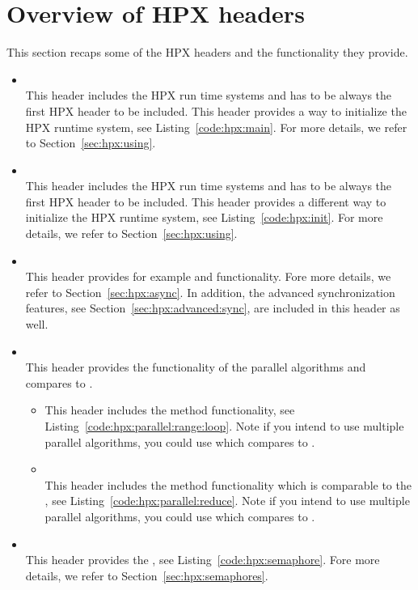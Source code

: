 \section{Overview of HPX headers}
This section recaps some of the HPX headers and the functionality they provide. 
\begin{itemize}
\item {} \\
This header includes the HPX run time systems and has to be always the first HPX header to be included. This header provides a way to initialize the HPX runtime system, see Listing~\ref{code:hpx:main}. For more details, we refer to Section~\ref{sec:hpx:using}. 

\item {} \\
This header includes the HPX run time systems and has to be always the first HPX header to be included. This header provides a different way to initialize the HPX runtime system, see Listing~\ref{code:hpx:init}. For more details, we refer to Section~\ref{sec:hpx:using}.

\item {} \\
This header provides for example  and  functionality. Fore more details, we refer to Section~\ref{sec:hpx:async}. In addition, the advanced synchronization features, see Section~\ref{sec:hpx:advanced:sync}, are included in this header as well.

\item {} \\
This header provides the functionality of the parallel algorithms and compares to .
\begin{itemize}
\item {}
This header includes the method  functionality, see Listing~\ref{code:hpx:parallel:range:loop}. Note if you intend to use multiple parallel algorithms, you could use  which compares to .
\item {} \\
This header includes the method  functionality which is comparable to the , see Listing~\ref{code:hpx:parallel:reduce}. Note if you intend to use multiple parallel algorithms, you could use  which compares to . 
\end{itemize}

\item {} \\
This header provides the , see Listing~\ref{code:hpx:semaphore}. Fore more details, we refer to Section~\ref{sec:hpx:semaphores}. 

\end{itemize}

\newpage
\theendnotes